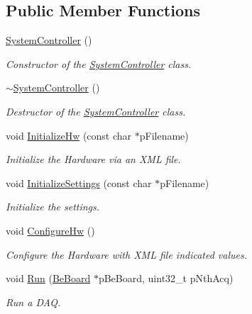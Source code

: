 \subsection*{Public Member Functions}
\begin{DoxyCompactItemize}
\item 
\hyperlink{class_ph2___system_1_1_system_controller_a7755f0304eb845c975862df469f25e70}{System\-Controller} ()
\begin{DoxyCompactList}\small\item\em Constructor of the \hyperlink{class_ph2___system_1_1_system_controller}{System\-Controller} class. \end{DoxyCompactList}\item 
\hyperlink{class_ph2___system_1_1_system_controller_abd794b0a85d9d83ec553d707875efcf1}{$\sim$\-System\-Controller} ()
\begin{DoxyCompactList}\small\item\em Destructor of the \hyperlink{class_ph2___system_1_1_system_controller}{System\-Controller} class. \end{DoxyCompactList}\item 
void \hyperlink{class_ph2___system_1_1_system_controller_ab6db20a430b09bd7888d7af0fb3b9511}{Initialize\-Hw} (const char $\ast$p\-Filename)
\begin{DoxyCompactList}\small\item\em Initialize the Hardware via an X\-M\-L file. \end{DoxyCompactList}\item 
void \hyperlink{class_ph2___system_1_1_system_controller_a9f1a7ff3ebeafde5f6e608842a139edb}{Initialize\-Settings} (const char $\ast$p\-Filename)
\begin{DoxyCompactList}\small\item\em Initialize the settings. \end{DoxyCompactList}\item 
void \hyperlink{class_ph2___system_1_1_system_controller_af0bb978523eb3a6436650d9e4f112432}{Configure\-Hw} ()
\begin{DoxyCompactList}\small\item\em Configure the Hardware with X\-M\-L file indicated values. \end{DoxyCompactList}\item 
void \hyperlink{class_ph2___system_1_1_system_controller_a566a9fd32ddb038dc935de263a0032f8}{Run} (\hyperlink{class_ph2___hw_description_1_1_be_board}{Be\-Board} $\ast$p\-Be\-Board, uint32\-\_\-t p\-Nth\-Acq)
\begin{DoxyCompactList}\small\item\em Run a D\-A\-Q. \end{DoxyCompactList}\end{DoxyCompactItemize}
